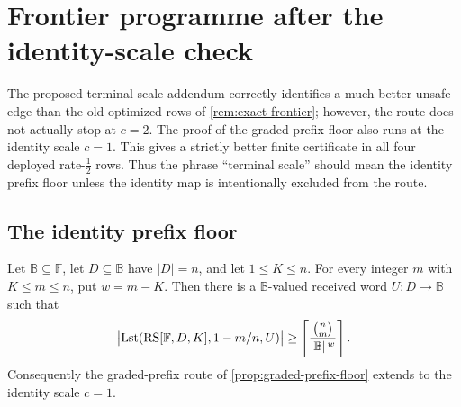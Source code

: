 
\providecommand{\B}{\mathbb B}
\providecommand{\F}{\mathbb F}
\providecommand{\Hb}{H_{\mathrm b}}
\providecommand{\Lst}{\mathrm{Lst}}
\providecommand{\emca}{\varepsilon_{\mathrm{mca}}}
\providecommand{\ceil}[1]{\left\lceil #1\right\rceil}
\providecommand{\floor}[1]{\left\lfloor #1\right\rfloor}

\section{Frontier programme after the identity-scale check}\label{sec:v13f1-frontier}

The proposed terminal-scale addendum correctly identifies a much better unsafe edge than the old optimized rows of \cref{rem:exact-frontier}; however, the route does not actually stop at $c=2$.  The proof of the graded-prefix floor also runs at the identity scale $c=1$.  This gives a strictly better finite certificate in all four deployed rate-$\tfrac12$ rows.  Thus the phrase ``terminal scale'' should mean the identity prefix floor unless the identity map is intentionally excluded from the route.

\subsection{The identity prefix floor}

\begin{lemma}\label{lem:v13f1-identity-prefix-floor}
Let $\B\subseteq\F$, let $D\subseteq\B$ have $|D|=n$, and let $1\le K\le n$.  For every integer $m$ with $K\le m\le n$, put $w=m-K$.  Then there is a $\B$-valued received word $U:D\to\B$ such that
\[
        \bigl|\Lst(\RS[\F,D,K],1-m/n,U)\bigr|
        \ge
        \left\lceil {\binom n m\over |\B|^{\,w}}\right\rceil .
\]
Consequently the graded-prefix route of \cref{prop:graded-prefix-floor} extends to the identity scale $c=1$.
\end{lemma}

